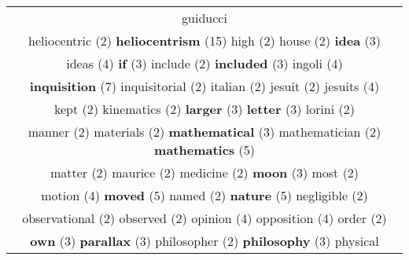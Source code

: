 \documentclass[12pt,a4paper]{article}
\begin{document}
\begin{center}
\begin{tabular}{|c|}
\textcolor{Verde} {guiducci}} \footnotesize{(2)}  \\ {\footnotesize \textcolor{Verde} {heliocentric}} \footnotesize{(2)} {\Huge \textcolor{AzulEscuro} {\bf heliocentrism}} \footnotesize{(15)} {\footnotesize \textcolor{Verde} {high}} \footnotesize{(2)} {\footnotesize \textcolor{Verde} {house}} \footnotesize{(2)} {\small \textcolor{Laranja} {\bf idea}} \footnotesize{(3)}  \\ {\normalsize \textcolor{VerdeLocao} {ideas}} \footnotesize{(4)} {\small \textcolor{Laranja} {\bf if}} \footnotesize{(3)} {\footnotesize \textcolor{Verde} {include}} \footnotesize{(2)} {\small \textcolor{Laranja} {\bf included}} \footnotesize{(3)} {\normalsize \textcolor{VerdeLocao} {ingoli}} \footnotesize{(4)}  \\ {\LARGE \textcolor{Rosa} {\bf inquisition}} \footnotesize{(7)} {\footnotesize \textcolor{Verde} {inquisitorial}} \footnotesize{(2)} {\footnotesize \textcolor{Verde} {italian}} \footnotesize{(2)} {\footnotesize \textcolor{Verde} {jesuit}} \footnotesize{(2)} {\normalsize \textcolor{VerdeLocao} {jesuits}} \footnotesize{(4)}  \\ {\footnotesize \textcolor{Verde} {kept}} \footnotesize{(2)} {\footnotesize \textcolor{Verde} {kinematics}} \footnotesize{(2)} {\small \textcolor{Laranja} {\bf larger}} \footnotesize{(3)} {\small \textcolor{Laranja} {\bf letter}} \footnotesize{(3)} {\footnotesize \textcolor{Verde} {lorini}} \footnotesize{(2)}  \\ {\footnotesize \textcolor{Verde} {manner}} \footnotesize{(2)} {\footnotesize \textcolor{Verde} {materials}} \footnotesize{(2)} {\small \textcolor{Laranja} {\bf mathematical}} \footnotesize{(3)} {\footnotesize \textcolor{Verde} {mathematician}} \footnotesize{(2)} {\large \textcolor{Roxo} {\bf mathematics}} \footnotesize{(5)}  \\ {\footnotesize \textcolor{Verde} {matter}} \footnotesize{(2)} {\footnotesize \textcolor{Verde} {maurice}} \footnotesize{(2)} {\footnotesize \textcolor{Verde} {medicine}} \footnotesize{(2)} {\small \textcolor{Laranja} {\bf moon}} \footnotesize{(3)} {\footnotesize \textcolor{Verde} {most}} \footnotesize{(2)}  \\ {\normalsize \textcolor{VerdeLocao} {motion}} \footnotesize{(4)} {\large \textcolor{Roxo} {\bf moved}} \footnotesize{(5)} {\footnotesize \textcolor{Verde} {named}} \footnotesize{(2)} {\large \textcolor{Roxo} {\bf nature}} \footnotesize{(5)} {\footnotesize \textcolor{Verde} {negligible}} \footnotesize{(2)}  \\ {\footnotesize \textcolor{Verde} {observational}} \footnotesize{(2)} {\footnotesize \textcolor{Verde} {observed}} \footnotesize{(2)} {\normalsize \textcolor{VerdeLocao} {opinion}} \footnotesize{(4)} {\normalsize \textcolor{VerdeLocao} {opposition}} \footnotesize{(4)} {\footnotesize \textcolor{Verde} {order}} \footnotesize{(2)}  \\ {\small \textcolor{Laranja} {\bf own}} \footnotesize{(3)} {\small \textcolor{Laranja} {\bf parallax}} \footnotesize{(3)} {\footnotesize \textcolor{Verde} {philosopher}} \footnotesize{(2)} {\small \textcolor{Laranja} {\bf philosophy}} \footnotesize{(3)} {\Large \textcolor{VermEscuro} {physical}} 
\end{tabular}
\end{center}
\end{document}
